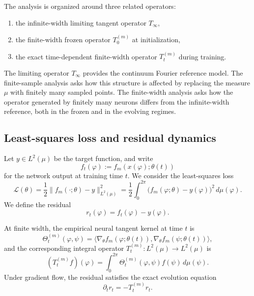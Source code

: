 The analysis is organized around three related operators:

\begin{enumerate}
	\item the infinite-width limiting tangent operator \(T_\infty\),
	\item the finite-width frozen operator \(T_0^{(m)}\) at initialization,
	\item the exact time-dependent finite-width operator \(T_t^{(m)}\) during training.
\end{enumerate}

The limiting operator \(T_\infty\) provides the continuum Fourier reference model. The
finite-sample analysis asks how this structure is affected by replacing the measure \(\mu\)
with finitely many sampled points. The finite-width analysis asks how the operator generated
by finitely many neurons differs from the infinite-width reference, both in the frozen and in
the evolving regimes.

\subsection{Least-squares loss and residual dynamics}

Let \(y\in L^2(\mu)\) be the target function, and write
\[
	f_t(\varphi):=f_m(x(\varphi);\theta(t))
\]
for the network output at training time \(t\). We consider the least-squares loss
\begin{equation}
	\mathcal{L}(\theta)
	=
	\frac{1}{2}\|f_m(\cdot;\theta)-y\|_{L^2(\mu)}^2
	=
	\frac{1}{2}\int_0^{2\pi}\bigl(f_m(\varphi;\theta)-y(\varphi)\bigr)^2\,d\mu(\varphi).
	\label{eq:method-loss-functional}
\end{equation}
We define the residual
\begin{equation}
	r_t(\varphi)=f_t(\varphi)-y(\varphi).
	\label{eq:method-residual-function}
\end{equation}

At finite width, the empirical neural tangent kernel at time \(t\) is
\begin{equation}
	\Theta_t^{(m)}(\varphi,\psi)
	=
	\bigl\langle \nabla_\theta f_m(\varphi;\theta(t)),
	\nabla_\theta f_m(\psi;\theta(t))\bigr\rangle,
	\label{eq:method-empirical-ntk}
\end{equation}
and the corresponding integral operator \(T_t^{(m)}:L^2(\mu)\to L^2(\mu)\) is
\begin{equation}
	(T_t^{(m)}f)(\varphi)
	=
	\int_0^{2\pi}\Theta_t^{(m)}(\varphi,\psi)f(\psi)\,d\mu(\psi).
	\label{eq:method-time-dependent-kernel-operator}
\end{equation}
Under gradient flow, the residual satisfies the exact evolution equation
\begin{equation}
	\partial_t r_t=-T_t^{(m)}r_t.
	\label{eq:method-exact-residual-flow}
\end{equation}

